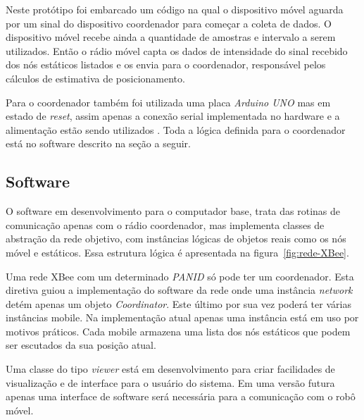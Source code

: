 Neste protótipo foi embarcado um código na qual o dispositivo móvel aguarda por um sinal do dispositivo coordenador para começar a coleta de dados. O dispositivo móvel recebe ainda a quantidade de amostras e intervalo a serem utilizados. Então o rádio móvel capta os dados de intensidade do sinal recebido dos nós estáticos listados e os envia para o coordenador, responsável pelos cálculos de estimativa de posicionamento.

Para o coordenador também foi utilizada uma placa \textit{Arduino UNO} mas em estado de \textit{reset}, assim apenas a conexão serial implementada no hardware e a alimentação estão sendo utilizados \cite{Faludi2010}. Toda a lógica definida para o coordenador está no software descrito na seção a seguir.

%

\subsection*{Software}

O software em desenvolvimento para o computador base, trata das rotinas de comunicação apenas com o rádio coordenador, mas implementa classes de abstração da rede objetivo, com instâncias lógicas de objetos reais como os nós móvel e estáticos. Essa estrutura lógica é apresentada na figura~\ref{fig:rede-XBee}.


Uma rede XBee com um determinado \textit{PANID} só pode ter um coordenador. Esta diretiva guiou a implementação do software da rede onde uma instância \textit{network} detém apenas um objeto \textit{Coordinator}. Este último por sua vez poderá ter várias instâncias mobile. Na implementação atual apenas uma instância está em uso por motivos práticos. Cada mobile armazena uma lista dos nós estáticos que podem ser escutados da sua posição atual.

Uma classe do tipo \textit{viewer} está em desenvolvimento para criar facilidades de visualização e de interface para o usuário do sistema. Em uma versão futura apenas uma interface de software será necessária para a comunicação com o robô móvel.

